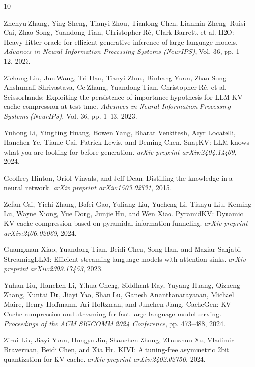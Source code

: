 \documentclass[11pt]{article}
\begin{document}

\begin{thebibliography}{10}

Zhenyu Zhang, Ying Sheng, Tianyi Zhou, Tianlong Chen, Lianmin Zheng, Ruisi Cai, Zhao Song, Yuandong Tian, Christopher Ré, Clark Barrett, et al.
\newblock H2O: Heavy-hitter oracle for efficient generative inference of large language models.
\newblock \textit{Advances in Neural Information Processing Systems (NeurIPS)}, Vol. 36, pp. 1--12, 2023.

Zichang Liu, Jue Wang, Tri Dao, Tianyi Zhou, Binhang Yuan, Zhao Song, Anshumali Shrivastava, Ce Zhang, Yuandong Tian, Christopher Ré, et al.
\newblock Scissorhands: Exploiting the persistence of importance hypothesis for LLM KV cache compression at test time.
\newblock \textit{Advances in Neural Information Processing Systems (NeurIPS)}, Vol. 36, pp. 1--13, 2023.

Yuhong Li, Yingbing Huang, Bowen Yang, Bharat Venkitesh, Acyr Locatelli, Hanchen Ye, Tianle Cai, Patrick Lewis, and Deming Chen.
\newblock SnapKV: LLM knows what you are looking for before generation.
\newblock \textit{arXiv preprint arXiv:2404.14469}, 2024.

Geoffrey Hinton, Oriol Vinyals, and Jeff Dean.
\newblock Distilling the knowledge in a neural network.
\newblock \textit{arXiv preprint arXiv:1503.02531}, 2015.

Zefan Cai, Yichi Zhang, Bofei Gao, Yuliang Liu, Yucheng Li, Tianyu Liu, Keming Lu, Wayne Xiong, Yue Dong, Junjie Hu, and Wen Xiao.
\newblock PyramidKV: Dynamic KV cache compression based on pyramidal information funneling.
\newblock \textit{arXiv preprint arXiv:2406.02069}, 2024.

Guangxuan Xiao, Yuandong Tian, Beidi Chen, Song Han, and Maziar Sanjabi.
\newblock StreamingLLM: Efficient streaming language models with attention sinks.
\newblock \textit{arXiv preprint arXiv:2309.17453}, 2023.

Yuhan Liu, Hanchen Li, Yihua Cheng, Siddhant Ray, Yuyang Huang, Qizheng Zhang, Kuntai Du, Jiayi Yao, Shan Lu, Ganesh Ananthanarayanan, Michael Maire, Henry Hoffmann, Ari Holtzman, and Junchen Jiang.
\newblock CacheGen: KV Cache compression and streaming for fast large language model serving.
\newblock \textit{Proceedings of the ACM SIGCOMM 2024 Conference}, pp. 473--488, 2024.

Zirui Liu, Jiayi Yuan, Hongye Jin, Shaochen Zhong, Zhaozhuo Xu, Vladimir Braverman, Beidi Chen, and Xia Hu.
\newblock KIVI: A tuning-free asymmetric 2bit quantization for KV cache.
\newblock \textit{arXiv preprint arXiv:2402.02750}, 2024.

\end{thebibliography}
\end{document}
